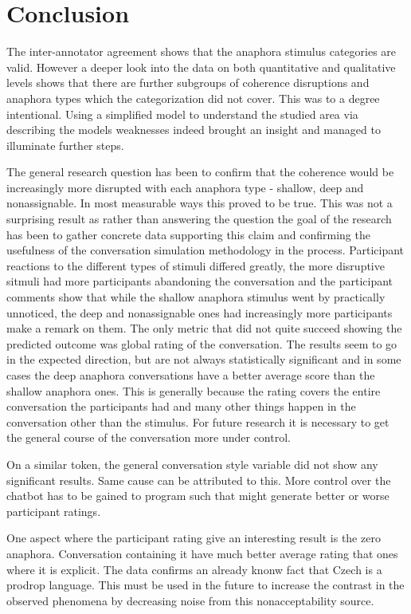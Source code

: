 \section{Conclusion}

The inter-annotator agreement shows that the anaphora stimulus categories are valid.
However a deeper look into the data on both quantitative and qualitative levels shows
that there are further subgroups of coherence disruptions and anaphora types
which the categorization did not cover.
This was to a degree intentional.
Using a simplified model to understand the studied area via describing the models weaknesses
indeed brought an insight and managed to illuminate further steps.

The general research question has been to confirm that the coherence would be increasingly more disrupted
with each anaphora type - shallow, deep and nonassignable.
In most measurable ways this proved to be true.
This was not a surprising result as rather than answering the question
the goal of the research has been to gather concrete data supporting this claim
and confirming the usefulness of the conversation simulation methodology in the process.
Participant reactions to the different types of stimuli differed greatly,
the more disruptive sitmuli had more participants abandoning the conversation and
the participant comments show that while the shallow anaphora stimulus went by practically unnoticed,
the deep and nonassignable ones had increasingly more participants make a remark on them.
The only metric that did not quite succeed showing the predicted outcome was global rating of the conversation.
The results seem to go in the expected direction, but are not always statistically significant and
in some cases the deep anaphora conversations have a better average score than the shallow anaphora ones.
This is generally because the rating covers the entire conversation the participants had
and many other things happen in the conversation other than the stimulus.
For future research it is necessary to get the general course of the conversation more under control.

On a similar token, the general conversation style variable did not show any significant results.
Same cause can be attributed to this.
More control over the chatbot has to be gained
to program such that might generate better or worse participant ratings.

One aspect where the participant rating give an interesting result is the zero anaphora.
Conversation containing it have much better average rating that ones where it is explicit.
The data confirms an already knonw fact that Czech is a prodrop language.
This must be used in the future to increase the contrast in the observed phenomena
by decreasing noise from this nonacceptability source.

